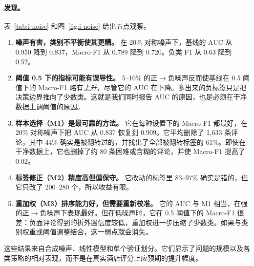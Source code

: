 \documentclass[11pt,a4paper]{article}
\begin{document}
\paragraph{发现。}
表~\ref{tab:i-noise} 和图~\ref{fig:i-noise} 给出五点观察。
\begin{enumerate}
  \item \textbf{噪声有害，类别不平衡使其更糟。} 在 20\% 对称噪声下，基线的 AUC 从 0.950 降到 0.837，Macro-F1 从 0.789 降到 0.720。负类 F1 从 0.63 降到 0.52。
  \item \textbf{阈值 0.5 下的指标可能有误导性。} 5--10\% 的正$\to$负噪声反而使基线在 0.5 阈值下的 Macro-F1 略有\emph{上升}，尽管它的 AUC 在下降。多出来的负标签只是把决策边界推向了少数类。这就是我们同时报告 AUC 的原因，也是必须在干净数据上调阈值的原因。
  \item \textbf{样本选择（M1）是最可靠的方法。} 它在每种设置下的 Macro-F1 都最好，在 20\% 对称噪声下把 AUC 从 0.837 恢复到 0.909。它平均删除了 1{,}633 条评论，其中 44\% 确实是被翻转过的，并找出了全部被翻转标签的 61\%。即使在干净数据上，它也删掉了约 80 条困难或含糊的评论，并使 Macro-F1 提高了 0.02。
  \item \textbf{标签修正（M2）精度高但偏保守。} 它改动的标签里 83--97\% 确实是错的，但它只改了 200--280 个，所以收益有限。
  \item \textbf{重加权（M3）排序能力好，但需要重新校准。} 它的 AUC 与 M1 相当，在强的正$\to$负噪声下表现最好。但在低噪声时，它在 0.5 阈值下的 Macro-F1 很差：负面评论得到的折外置信度较低，重加权进一步压缩了少数类。如果与类别权重或阈值调整结合，这一弱点就会消失。
\end{enumerate}
这些结果来自合成噪声、线性模型和单个验证划分。它们显示了问题的规模以及各类策略的相对表现，而不是在真实酒店评分上应预期的提升幅度。
\end{document}

